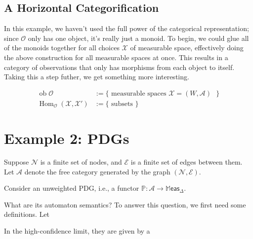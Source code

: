 \documentclass{article}
\DeclareMathOperator{\ob}{\mathrm{ob}}
\DeclareMathOperator{\Hom}{\mathrm{Hom}}
\newcommand\A{\mathcal{A}}
\newcommand\Meas{\mathbb{M}\mathsf{eas}}
\newcommand{\N}{\mathcal N}
\newcommand{\Ed}{\mathcal E}
\newcommand{\dg}[1]{\mathbdcal{#1}}
\begin{document}
    
    \subsection*{A Horizontal Categorification}
    In this example, we haven't used the full power of the categorical representation; since $\mathcal O$ only has one object, it's really just a monoid. 
    To begin, we could glue all of the monoids together for all choices $\mathcal X$ of measurable space, effectively doing the above construction for all measurable spaces at once. This results in a category of observations that only has morphisms from each object to itself.     
    Taking this a step futher, we get something more interesting.
    
    \begin{align*}
        \ob \mathcal O &:= 
            \{ \text{ measurable spaces $\mathcal X = (W, \mathcal A)$ } \}\\
        \Hom_{\mathcal O}(\mathcal X, \mathcal X') &:= 
            \Big\{ \text{ subsets } \Big\}
    \end{align*}
    
    
    \section{Example 2: PDGs}
    
    Suppose $\N$ is a finite set of nodes, and $\Ed$ is a finite set of edges between them. Let $\A$ denote the free category generated by the graph $(\N, \Ed)$. 
        
    Consider an unweighted PDG, i.e., a functor $\mathbb P : \A \to \Meas_\Delta$.
    
    What are its automaton semantics?
    To answer this question, we first need some definitions.
    Let 
    
     In the high-confidence limit, they are given by a 
    
\end{document}
